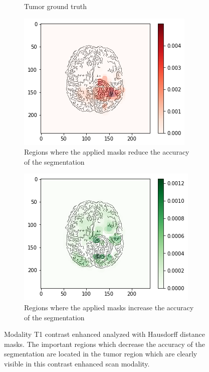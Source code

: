 \begin{figure}[H]
\begin{subfigure}[t]{.4\textwidth}
        \caption{Tumor ground truth}
    \end{subfigure}
    \begin{subfigure}[t]{.45\textwidth}
        \centering
        \includegraphics[width=\linewidth]{chapters/06_hdm/b_Brats18_TCIA08_242_1_L2/28.png}
        \caption{Regions where the applied masks reduce the accuracy of the segmentation}
    \end{subfigure}\hspace{1cm}%
    \begin{subfigure}[t]{.45\textwidth}
        \centering
        \includegraphics[width=\linewidth]{chapters/06_hdm/b_Brats18_TCIA08_242_1_L2/29.png}
        \caption{Regions where the applied masks increase the accuracy of the segmentation}
    \end{subfigure}
    \caption{Modality T1 contrast enhanced analyzed with Hausdorff distance masks. The important regions which decrease the accuracy of the segmentation are located in the tumor region which are clearly visible in this contrast enhanced scan modality.}
    \label{brats_tcia08_t1ce}
\end{figure}

